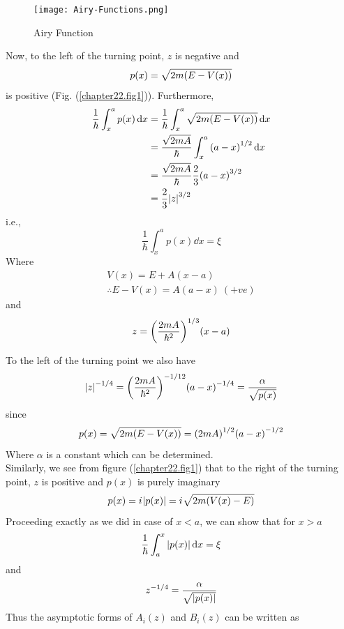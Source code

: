 \begin{figure}
	\centering
	\texttt{[image: Airy-Functions.png]}
	\caption{Airy Function}
	\label{chapter22.fig2}
\end{figure}
Now, to the left of the turning point, $z$ is negative and 
\begin{equation}
	p(x) = \sqrt{2 m \qty(E - V(x))}
\end{equation}
is positive (Fig. (\ref{chapter22.fig1})). Furthermore,
\begin{align*}
	\frac{1}{\hbar} \int_{x}^{a} p(x) \dd{x} 
	&= \frac{1}{\hbar} \int_{x}^{a} \sqrt{2 m \qty(E - V(x))} \dd{x} \\
	&= \frac{\sqrt{2 m A}}{\hbar} \int_{x}^{a} \qty(a - x)^{1/2} \dd{x} \\
	&= \frac{\sqrt{2 m A}}{\hbar} \frac{2}{3} \qty(a - x)^{3/2} \\
	&= \frac{2}{3} \abs{z}^{3/2}
\end{align*}
i.e.,
\begin{equation}
\label{chapter22.eqn36}
	\frac{1}{\hbar} \int_{x}^{a} p(x) \dd{x} = \xi
\end{equation}
Where 
\begin{align*}
V(x) = E + A (x-a) \\
\therefore E-V(x) = A(a-x) \ (+ ve)
\end{align*}
and
\begin{equation*}
z = \qty(\frac{2 m A}{\hbar^2})^{1/3} \qty(x-a)
\end{equation*}

To the left of the turning point we also have
\begin{equation}
\abs{z}^{-1/4} = \qty(\frac{2 m A}{\hbar^2})^{-1/12} \qty(a - x)^{-1/4} = \frac{\alpha}{\sqrt{p(x)}}
\end{equation}
since
\begin{equation}
p(x) = \sqrt{2m \qty(E - V(x))} = \qty(2 m A)^{1/2} \qty(a - x)^{-1/2}
\end{equation}
Where $\alpha$ is a constant which can be determined.\\

Similarly, we see from figure (\ref{chapter22.fig1}) that to the right of the turning point, $z$ is positive and $p(x)$ is purely imaginary
\begin{equation}
p(x)  = {i\mkern1mu} \abs{p(x)} = {i\mkern1mu} \sqrt{2 m \qty(V(x) - E)}
\end{equation}
Proceeding exactly as we did in case of $x<a$, we can show that for $x>a$
\begin{equation}
\label{chapter22.eqn38}
\frac{1}{\hbar} \int_{a}^{x} \abs{p(x)} \dd{x} = \xi
\end{equation}
and
\begin{equation}
\label{chapter22.eqn39}
z^{-1/4} = \frac{\alpha}{\sqrt{\abs{p(x)}}}
\end{equation}
Thus the asymptotic forms of $A_i(z)$ and $B_i(z)$ can be written as


